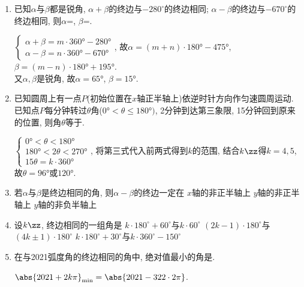 \begin{enumerate}
\item 已知$\alpha$与$\beta$都是锐角, $\alpha+\beta$的终边与$-280^{\circ}$的终边相同; 
$\alpha-\beta$的终边与$-670^{\circ}$的终边相同, 则$\alpha$=, $\beta$=. 
\begin{jieda}
$\begin{cases}
\alpha+\beta=m\cdot\ang{360}-\ang{280}\\
\alpha-\beta=n\cdot\ang{360}-\ang{670}
\end{cases}$, 
故$\alpha=\left(m+n\right)\cdot\ang{180}-\ang{475}$, $\beta=\left(m-n\right)\cdot\ang{180}+\ang{195}$. \\
又$\alpha,\beta$是锐角, 故$\alpha=\ang{65}$, $\beta=\ang{15}$. 
\end{jieda}


\item 已知圆周上有一点$P$(初始位置在$x$轴正半轴上)依逆时针方向作匀速圆周运动. 已知点$P$每分钟转过$\theta$角($\ang{0}<\theta\leq\ang{180})$, 
2分钟到达第三象限, 15分钟回到原来的位置, 则角$\theta$等于. 
\begin{jieda}
$\begin{cases}
\ang{0}<\theta<\ang{180}\\
\ang{180}<2\theta<\ang{270}\\
15\theta=k\cdot\ang{360}
\end{cases}$, 
将第三式代入前两式得到$k$的范围, 结合$k\zz$得$k=4,5$, 故$\theta=\ang{96}$或$\ang{120}$. 
\end{jieda}


\item 若$\alpha$与$\beta$是终边相同的角, 则$\alpha-\beta$的终边一定在
{$x$轴的非正半轴上}
{$y$轴的非正半轴上}
{$y$轴的非负半轴上}



\item 设$k\zz$, 终边相同的一组角是
{$k\cdot 180^{\circ}+60^{\circ}$与$k\cdot 60^{\circ}$}
{$\left(2k-1\right)\cdot 180^{\circ}$与$\left(4k\pm 1\right)\cdot 180^{\circ}$}
{$k\cdot 180^{\circ}+30^{\circ}$与$k\cdot 360^{\circ}-150^{\circ}$}



\item 在与2021弧度角的终边相同的角中, 绝对值最小的角是. 
\begin{jieda}
$\abs{2021+2k\pi}_{\min}=\abs{2021-322\cdot2\pi}$. 
\end{jieda}




\end{enumerate}

